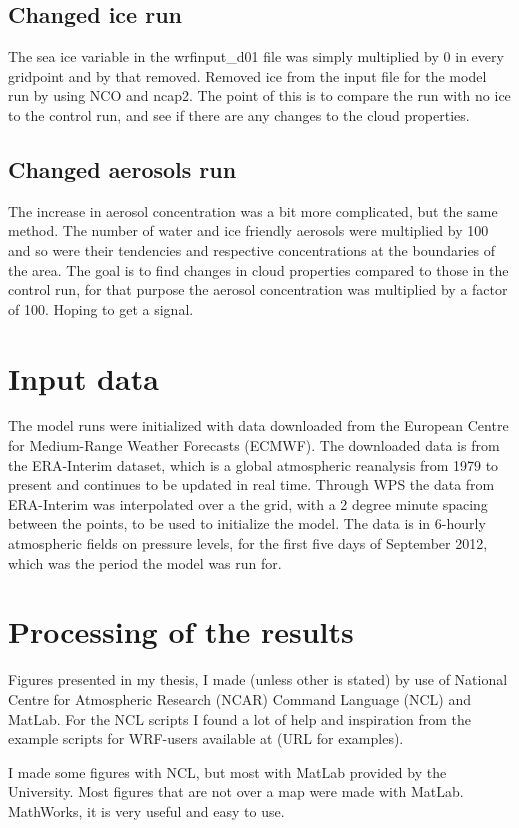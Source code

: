 \subsection{Changed ice run}
The sea ice variable in the wrfinput_d01 file was simply multiplied by 0 in every gridpoint and by that removed.
Removed ice from the input file for the model run by using NCO and ncap2. The point of this is to compare the run with no ice to the control run, and see if there are any changes to the cloud properties.

\subsection{Changed aerosols run}
The increase in aerosol concentration was a bit more complicated, but the same method. The number of water and ice friendly aerosols were multiplied by 100 and so were their tendencies and respective concentrations at the boundaries of the area. %
The goal is to find changes in cloud properties compared to those in the control run, for that purpose the aerosol concentration was multiplied by a factor of 100. Hoping to get a signal.

\section{Input data}
The model runs were initialized with data downloaded from the European Centre for Medium-Range Weather Forecasts (ECMWF).%
The downloaded data is from the ERA-Interim dataset, which is a global atmospheric reanalysis from 1979 to present and continues to be updated in real time.%
Through WPS the data from ERA-Interim was interpolated over a the grid, with a 2 degree minute spacing between the points, to be used to initialize the model. The data is in 6-hourly atmospheric fields on pressure levels, for the first five days of September 2012, which was the period the model was run for.

\section{Processing of the results}
Figures presented in my thesis, I made (unless other is stated) by use of National Centre for Atmospheric Research (NCAR) Command Language (NCL) and MatLab. For the NCL scripts I found a lot of help and inspiration from the example scripts for WRF-users available at (URL for examples).

I made some figures with NCL, but most with MatLab provided by the University. Most figures that are not over a map were made with MatLab. MathWorks, it is very useful and easy to use.